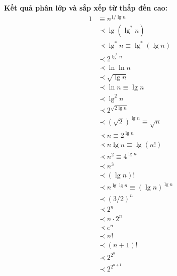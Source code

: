 \documentclass[12pt,a4paper]{article}
\begin{document}
\begin{resultbox}
\textbf{Kết quả phân lớp và sắp xếp từ thấp đến cao:}
\begin{align*}
  1 &\equiv n^{1/\lg n} \\
    &\prec \lg(\lg^* n) \\
    &\prec \lg^* n \equiv \lg^*(\lg n) \\
    &\prec 2^{\lg^* n} \\
    &\prec \ln \ln n \\
    &\prec \sqrt{\lg n} \\
    &\prec \ln n \equiv \lg n \\
    &\prec \lg^2 n \\
    &\prec 2^{\sqrt{2 \lg n}} \\
    &\prec (\sqrt{2})^{\lg n} \equiv \sqrt{n} \\
    &\prec n \equiv 2^{\lg n} \\
    &\prec n\lg n \equiv \lg(n!) \\
    &\prec n^2 \equiv 4^{\lg n} \\
    &\prec n^3 \\
    &\prec (\lg n)! \\
    &\prec n^{\lg\lg n} \equiv (\lg n)^{\lg n} \\
    &\prec (3/2)^n \\
    &\prec 2^n \\
    &\prec n \cdot 2^n \\
    &\prec e^n \\
    &\prec n! \\
    &\prec (n+1)! \\
    &\prec 2^{2^n} \\
    &\prec 2^{2^{n+1}}
\end{align*}
\end{resultbox}
\end{document}
